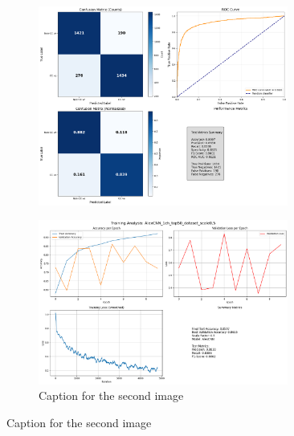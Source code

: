 \documentclass{pracalicmgr}
\begin{document}
\newpage

\begin{figure}[H]
    \centering
    \begin{subfigure}{\textwidth}
        \centering
        \includegraphics[width=0.9\textwidth]{src/AlexCNN_1ch_top50_dataset_scale0.5.png}
        \label{fig:top5005sub1}
    \end{subfigure}
    
    \vspace{1cm}
    
    \begin{subfigure}{\textwidth}
        \centering
        \includegraphics[width=0.9\textwidth]{src/AlexCNN_1ch_top50_dataset_scale05losses.png}
        \caption{Caption for the second image}
        \label{fig:top5005sub2}
    \end{subfigure}
    \label{fig:top5005stacked}
\end{figure}
\end{document}
